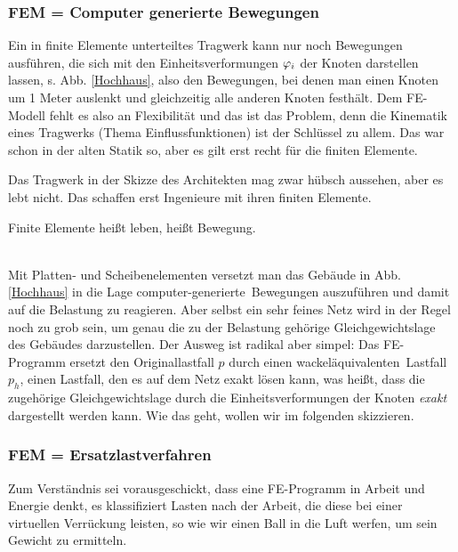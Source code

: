 \vspace{-0.5cm}
{\textcolor{sectionTitleBlue}{\subsubsection*{FEM = Computer generierte Bewegungen }}}



Ein in finite Elemente unterteiltes Tragwerk kann nur noch Bewegungen ausf\"{u}hren, die sich mit den Einheitsverformungen $\varphi_i$ der Knoten darstellen lassen, s. Abb. \ref{Hochhaus}, also den Bewegungen, bei denen man einen Knoten um 1 Meter auslenkt und gleichzeitig alle anderen Knoten festh\"{a}lt. Dem FE-Modell fehlt es also an Flexibilit\"{a}t und das ist das Problem, denn die Kinematik eines Tragwerks (Thema Einflussfunktionen) ist der Schl\"{u}ssel zu allem. Das war schon in der \glq alten Statik\grq{} so, aber es gilt erst recht f\"{u}r die finiten Elemente.

Das Tragwerk in der Skizze des Architekten mag zwar h\"{u}bsch aussehen, aber es lebt nicht. Das schaffen erst Ingenieure mit ihren finiten Elemente.\\

\hspace*{-12pt}\colorbox{highlightBlue}{\parbox{0.98\textwidth}{ Finite Elemente hei{\ss}t leben, hei{\ss}t Bewegung.}}\\

Mit Platten- und Scheibenelementen versetzt man das Geb\"{a}ude in Abb. \ref{Hochhaus} in die Lage \glq computer-generierte\grq\ Bewegungen auszuf\"{u}hren und damit auf die Belastung zu reagieren. Aber selbst ein sehr feines Netz wird in der Regel noch zu grob sein, um genau die zu der Belastung geh\"{o}rige Gleichgewichtslage des Geb\"{a}udes darzustellen. Der Ausweg ist radikal aber simpel: Das FE-Programm ersetzt den Originallastfall $p$ durch einen \glq wackel\"{a}quivalenten\grq\ Lastfall $p_h$, einen Lastfall, den es auf dem Netz exakt l\"{o}sen kann, was hei{\ss}t, dass die zugeh\"{o}rige Gleichgewichtslage durch die Einheitsverformungen der Knoten {\em exakt\/} dargestellt werden kann. Wie das geht, wollen wir im folgenden skizzieren.


{\textcolor{sectionTitleBlue}{\subsubsection*{FEM = Ersatzlastverfahren}}}

Zum Verst\"{a}ndnis sei vorausgeschickt, dass eine FE-Programm in Arbeit und Energie denkt, es klassifiziert Lasten nach der Arbeit, die diese bei einer virtuellen Verr\"{u}ckung leisten, so wie wir einen Ball in die Luft werfen, um sein Gewicht zu ermitteln.


